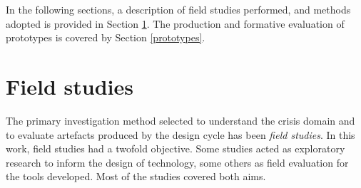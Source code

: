 In the following sections, a description of field studies performed, and methods adopted is provided in Section \ref{field-studies}. The production and formative evaluation of prototypes is covered by Section \ref{prototypes}.

\section{Field studies}\label{field-studies}

The primary investigation method selected to understand the crisis domain and to evaluate artefacts produced by the design cycle has been \emph{field studies}. In this work, field studies had a twofold objective. Some studies acted as exploratory research to inform the design of technology, some others as field evaluation for the tools developed. Most of the studies covered both aims.

